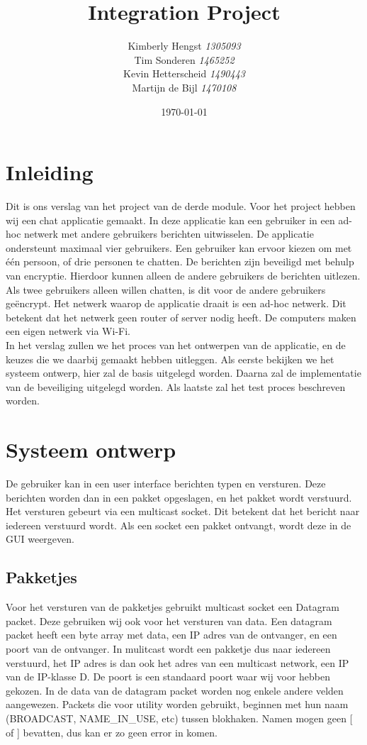 \documentclass{article}
\title{Integration Project}
\author{Kimberly Hengst \emph{1305093}\\ Tim Sonderen \emph{1465252}\\ Kevin Hetterscheid \emph{1490443}\\ Martijn de Bijl \emph{1470108}}
\date{\today}
\begin{document}
\maketitle

\newpage

\tableofcontents

\section{Inleiding}
Dit is ons verslag van het project van de derde module. Voor het project hebben wij een chat applicatie gemaakt. In deze applicatie kan een gebruiker in een ad-hoc netwerk met andere gebruikers berichten uitwisselen. De applicatie ondersteunt maximaal vier gebruikers. Een gebruiker kan ervoor kiezen om met één persoon, of drie personen te chatten. De berichten zijn beveiligd met behulp van encryptie. Hierdoor kunnen alleen de andere gebruikers de berichten uitlezen. Als twee gebruikers alleen willen chatten, is dit voor de andere gebruikers geëncrypt. Het netwerk waarop de applicatie draait is een ad-hoc netwerk. Dit betekent dat het netwerk geen router of server nodig heeft. De computers  maken een eigen netwerk via Wi-Fi.
\\
In het verslag zullen we het proces van het ontwerpen van de applicatie, en de keuzes die we daarbij gemaakt hebben uitleggen. Als eerste bekijken we het systeem ontwerp, hier zal de basis uitgelegd worden. Daarna zal de implementatie van de beveiliging uitgelegd worden. Als laatste zal het test proces beschreven worden.

\newpage

\section{Systeem ontwerp}
De gebruiker kan in een user interface berichten typen en versturen. Deze berichten worden dan in een pakket opgeslagen, en het pakket wordt verstuurd. Het versturen gebeurt via een multicast socket. Dit betekent dat het bericht naar iedereen verstuurd wordt. Als een socket een pakket ontvangt, wordt deze in de GUI weergeven. 

\subsection{Pakketjes}
Voor het versturen van de pakketjes gebruikt multicast socket een Datagram packet. Deze gebruiken wij ook voor het versturen van data. Een datagram packet heeft een byte array met data, een IP adres van de ontvanger, en een poort van de ontvanger. In mulitcast wordt een pakketje dus naar iedereen verstuurd, het IP adres is dan ook het adres van een multicast network, een IP van de IP-klasse D. De poort is een standaard poort waar wij voor hebben gekozen. In de data van de datagram packet worden nog enkele andere velden aangewezen. %
Packets die voor utility worden gebruikt, beginnen met hun naam (BROADCAST, NAME\_IN\_USE, etc) tussen blokhaken. Namen mogen geen [ of ] bevatten, dus kan er zo geen error in komen.
\end{document}
